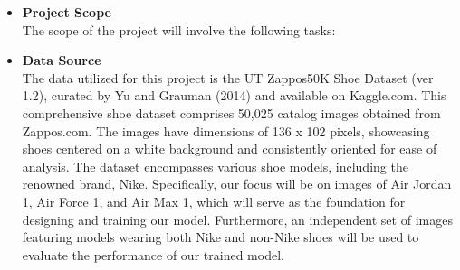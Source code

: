 \documentclass{article}
\begin{document}
\begin{itemize}
	   \item[] \textbf{Project Scope} \\
		The scope of the project will involve the following tasks: 
		
            \item[] \textbf{Data Source} \\
		The data utilized for this project is the UT Zappos50K Shoe Dataset (ver 1.2), curated by Yu and Grauman (2014) and available on Kaggle.com. This comprehensive shoe dataset comprises 50,025 catalog images obtained from Zappos.com. The images have dimensions of 136 x 102 pixels, showcasing shoes centered on a white background and consistently oriented for ease of analysis. The dataset encompasses various shoe models, including the renowned brand, Nike. Specifically, our focus will be on images of Air Jordan 1, Air Force 1, and Air Max 1, which will serve as the foundation for designing and training our model. Furthermore, an independent set of images featuring models wearing both Nike and non-Nike shoes will be used to evaluate the performance of our trained model.  
		

\end{itemize}
\end{document}
